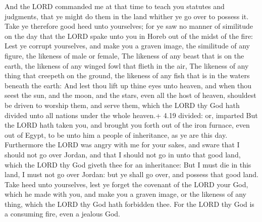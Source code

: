 And the LORD commanded me at that time to teach you
statutes and judgments, that ye might do them in the land whither ye go
over to possess it.  Take ye therefore good heed unto
yourselves; for ye saw no manner of similitude on the day that the LORD
spake unto you in Horeb out of the midst of the fire:  Lest
ye corrupt yourselves, and make you a graven image, the similitude of
any figure, the likeness of male or female,  The likeness
of any beast that is on the earth, the likeness of any winged fowl that
flieth in the air,  The likeness of any thing that creepeth
on the ground, the likeness of any fish that is in the waters beneath
the earth:  And lest thou lift up thine eyes unto heaven,
and when thou seest the sun, and the moon, and the stars, even all the
host of heaven, shouldest be driven to worship them, and serve them,
which the LORD thy God hath divided unto all nations under the whole
heaven.+ 4.19 divided: or, imparted  But the LORD hath
taken you, and brought you forth out of the iron furnace, even out of
Egypt, to be unto him a people of inheritance, as ye are this day.
 Furthermore the LORD was angry with me for your sakes, and
sware that I should not go over Jordan, and that I should not go in unto
that good land, which the LORD thy God giveth thee for an inheritance:
 But I must die in this land, I must not go over Jordan:
but ye shall go over, and possess that good land.  Take
heed unto yourselves, lest ye forget the covenant of the LORD your God,
which he made with you, and make you a graven image, or the likeness of
any thing, which the LORD thy God hath forbidden thee.  For
the LORD thy God is a consuming fire, even a jealous God.

